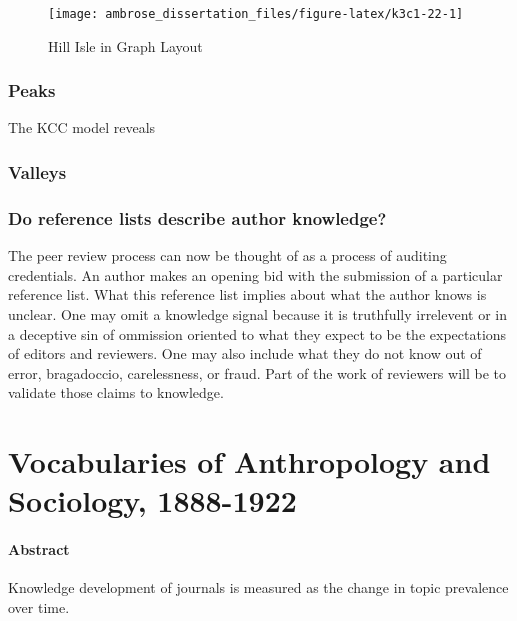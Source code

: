 \documentclass[]{book}
\theoremstyle{definition}
\theoremstyle{definition}
\theoremstyle{definition}
\theoremstyle{remark}
\begin{document}
\begin{figure}

{\centering \texttt{[image: ambrose\_dissertation\_files/figure-latex/k3c1-22-1]} 

}

\caption{Hill Isle in Graph Layout}\label{fig:k3c1-22}
\end{figure}

\hypertarget{peaks}{%
\subsection{Peaks}\label{peaks}}

The KCC model reveals

\hypertarget{valleys}{%
\subsection{Valleys}\label{valleys}}

\hypertarget{do-reference-lists-describe-author-knowledge}{%
\subsection{Do reference lists describe author
knowledge?}\label{do-reference-lists-describe-author-knowledge}}

The peer review process can now be thought of as a process of auditing
credentials. An author makes an opening bid with the submission of a
particular reference list. What this reference list implies about what
the author knows is unclear. One may omit a knowledge signal because it
is truthfully irrelevent or in a deceptive sin of ommission oriented to
what they expect to be the expectations of editors and reviewers. One
may also include what they do not know out of error, bragadoccio,
carelessness, or fraud. Part of the work of reviewers will be to
validate those claims to knowledge.

\hypertarget{voc}{%
\chapter{Vocabularies of Anthropology and Sociology,
1888-1922}\label{voc}}

\hypertarget{abstract-3}{%
\subsubsection*{Abstract}\label{abstract-3}}


Knowledge development of journals is measured as the
change in topic prevalence over time.
\end{document}
